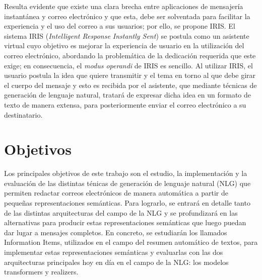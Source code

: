 Resulta evidente que existe una clara brecha entre aplicaciones de mensajería instantánea y correo electrónico y que esta, debe ser solventada para facilitar la experiencia y el uso del correo a sus usuarios; por ello, se propone IRIS. El sistema IRIS (\textit{Intelligent Response Instantly Sent}) se postula como un asistente virtual cuyo objetivo es mejorar la experiencia de usuario en la utilización del correo electrónico, abordando la problemática de la dedicación requerida que este exige; en consecuencia, el \textit{modus operandi} de IRIS es sencillo. Al utilizar IRIS, el usuario postula la idea que quiere transmitir y el tema en torno al que debe girar el cuerpo del mensaje y esto es recibida por el asistente, que mediante técnicas de generación de lenguaje natural, tratará de expresar dicha idea en un formato de texto de manera extensa, para posteriormente enviar el correo electrónico a su destinatario.


\section{Objetivos}\label{obj}
Los principales objetivos de este trabajo son el estudio, la implementación y la evaluación de las distintas ténicas de generación de lenguaje natural (NLG) que permiten redactar correos electrónicos de manera automática a partir de pequeñas representaciones semánticas. Para lograrlo, se entrará en detalle tanto de las distintas arquitecturas del campo de la NLG y se profundizará en las alternativas para producir estas representaciones semánticas que luego puedan dar lugar a mensajes completos. En concreto, se estudiarán los llamados Information Items, utilizados en el campo del resumen automático de textos, para implementar estas representaciones semánticas y evaluarlas con las dos arquitecturas principales hoy en día en el campo de la NLG: los modelos transformers y realizers.

